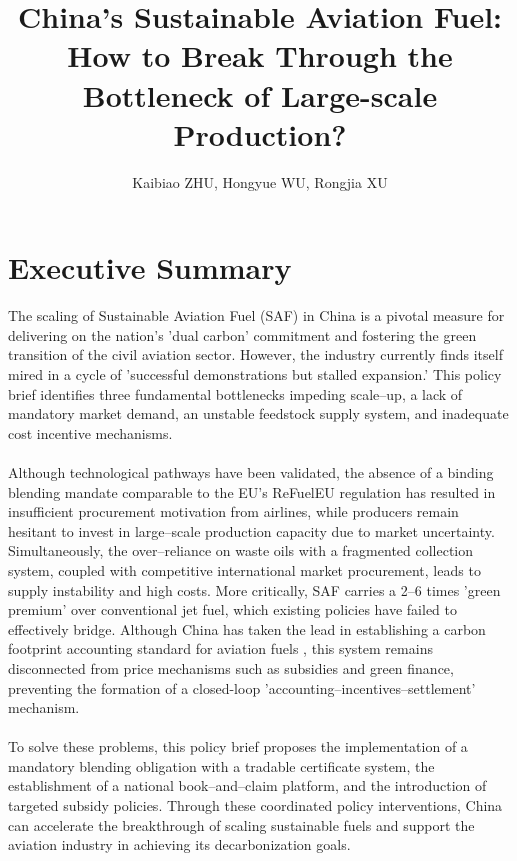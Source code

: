 \documentclass[a4paper,11pt]{article}
\title{\color{schoolblue}\textbf{China's Sustainable Aviation Fuel: How to Break Through the Bottleneck of Large-scale Production?}}
\author{Kaibiao ZHU, Hongyue WU, Rongjia XU}
\date{}
\begin{document}
\maketitle

\section*{Executive Summary}
\begin{tcolorbox}[summarystyle]

The scaling of Sustainable Aviation Fuel (SAF) in China is a pivotal measure for delivering on the nation's 'dual carbon' commitment and fostering the green transition of the civil aviation sector. However, the industry currently finds itself mired in a cycle of 'successful demonstrations but stalled expansion.' This policy brief identifies three fundamental bottlenecks impeding scale--up, a lack of mandatory market demand, an unstable feedstock supply system, and inadequate cost incentive mechanisms.\\
\\
Although technological pathways have been validated, the absence of a binding blending mandate comparable to the EU's ReFuelEU regulation has resulted in insufficient procurement motivation from airlines, while producers remain hesitant to invest in large--scale production capacity due to market uncertainty. Simultaneously, the over--reliance on waste oils with a fragmented collection system, coupled with competitive international market procurement, leads to supply instability and high costs. More critically, SAF carries a 2--6 times 'green premium' over conventional jet fuel, which existing policies have failed to effectively bridge. Although China has taken the lead in establishing a carbon footprint accounting standard for aviation fuels \cite{caac2025}, this system remains disconnected from price mechanisms such as subsidies and green finance, preventing the formation of a closed-loop 'accounting--incentives--settlement' mechanism.\\
\\
To solve these problems, this policy brief proposes the implementation of a mandatory blending obligation with a tradable certificate system, the establishment of a national book--and--claim platform, and the introduction of targeted subsidy policies. Through these coordinated policy interventions, China can accelerate the breakthrough of scaling sustainable fuels and support the aviation industry in achieving its decarbonization goals.
\end{tcolorbox}
\end{document}
